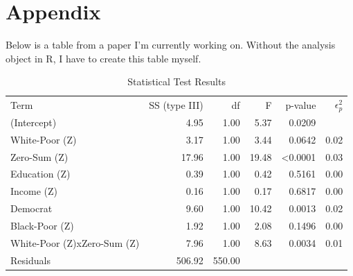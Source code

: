\documentclass{article}\usepackage[]{graphicx}\usepackage[]{xcolor}
\begin{document}
\newpage
\onecolumn
\section{Appendix}
Below is a table from a paper I’m currently working on. Without the analysis object in R, I have to create this table myself.
\begin{table}[H]
  \begin{center}
    \begin{tabular}{l r r r r r}
      \hline
      Term & SS (type III) & df & F & p-value & \(\epsilon^2_p\) \\
      (Intercept) & 4.95 & 1.00 & 5.37 & 0.0209 &  \\
      White-Poor (Z) & 3.17 & 1.00 & 3.44 & 0.0642 & 0.02\\
      Zero-Sum (Z) & 17.96 & 1.00 & 19.48 & <0.0001 & 0.03\\
      Education (Z) & 0.39 & 1.00 & 0.42 & 0.5161 & 0.00\\
      Income (Z) & 0.16 & 1.00 & 0.17 & 0.6817 & 0.00\\
      Democrat & 9.60 & 1.00 & 10.42 & 0.0013 & 0.02\\
      Black-Poor (Z) & 1.92 & 1.00 & 2.08 & 0.1496 & 0.00\\
      White-Poor (Z)xZero-Sum (Z) & 7.96 & 1.00 & 8.63 & 0.0034 & 0.01\\
      Residuals & 506.92 & 550.00 &  &  & \\
      \hline
    \end{tabular}    
    \caption{Statistical Test Results}
    \label{table2.tab}
  \end{center}
\end{table}
\end{document}
